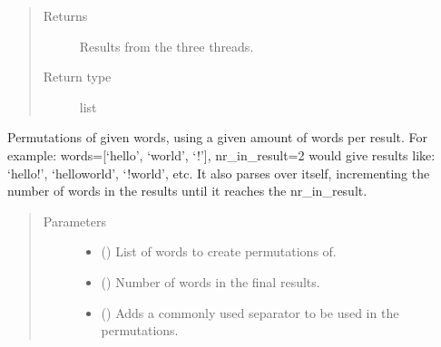 \documentclass[letterpaper,10pt,english]{sphinxmanual}
\begin{document}
\begin{fulllineitems}
\begin{fulllineitems}
\begin{quote}
\begin{description}
\item[{Returns}] \leavevmode
\sphinxAtStartPar
{} \textendash{} Results from the three threads.

\item[{Return type}] \leavevmode
\sphinxAtStartPar
list

\end{description}\end{quote}

\end{fulllineitems}


\begin{fulllineitems}
\label{\detokenize{EntroPass:EntroPass.pwd_gen.Pwd_gen.word_perms}}
\sphinxAtStartPar
Permutations of given words, using a given amount of  words per
result. For example: words={[}‘hello’, ‘world’, ‘!’{]}, nr\_in\_result=2
would give results like: ‘hello!’, ‘helloworld’, ‘!world’, etc.
It also parses over itself, incrementing the number of words in the results until it
reaches the nr\_in\_result.
\begin{quote}\begin{description}
\item[{Parameters}] \leavevmode\begin{itemize}
\item {} 
\sphinxAtStartPar
{} () \textendash{} List of words to create permutations of.

\item {} 
\sphinxAtStartPar
{} () \textendash{} Number of words in the final results.

\item {} 
\sphinxAtStartPar
{} (\sphinxstyleliteralemphasis{\sphinxupquote{, }}) \textendash{} Adds a commonly used separator to be used in the permutations.


\end{itemize}
\end{description}
\end{quote}
\end{fulllineitems}
\end{fulllineitems}
\end{document}
